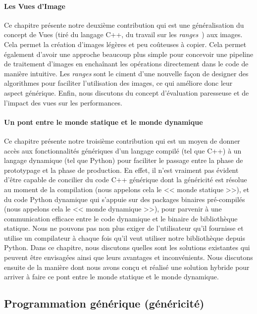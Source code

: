\paragraph{Les Vues d'Image} Ce chapitre présente notre deuxième contribution qui est une généralisation du concept de
Vues (tiré du langage C++, du travail sur les \emph{ranges}~\parencite{niebler.2018.ranges}) aux images. Cela permet la
création d'images légères et peu coûteuses à copier. Cela permet également d'avoir une approche beaucoup plus simple
pour concevoir une pipeline de traitement d'images en enchaînant les opérations directement dans le code de manière
intuitive. Les \emph{ranges} sont le ciment d'une nouvelle façon de designer des algorithmes pour faciliter
l'utilisation des images, ce qui améliore donc leur aspect générique. Enfin, nous discutons du concept d'évaluation
paresseuse et de l'impact des vues sur les performances.

\paragraph{Un pont entre le monde statique et le monde dynamique} Ce chapitre présente notre troisième contribution qui
est un moyen de donner accès aux fonctionnalités génériques d'un langage compilé (tel que C++) à un langage dynamique
(tel que Python) pour faciliter le passage entre la phase de prototypage et la phase de production. En effet, il n'est
vraiment pas évident d'être capable de concilier du code C++ générique dont la généricité est résolue au moment de la
compilation (nous appelons cela le << monde statique >>), et du code Python dynamique qui s'appuie sur des packages
binaires pré-compilés (nous appelons cela le << monde dynamique >>), pour parvenir à une communication efficace entre le
code dynamique et le binaire de bibliothèque statique. Nous ne pouvons pas non plus exiger de l'utilisateur qu'il
fournisse et utilise un compilateur à chaque fois qu'il veut utiliser notre bibliothèque depuis Python. Dans ce
chapitre, nous discutons quelles sont les solutions existantes qui peuvent être envisagées ainsi que leurs avantages et
inconvénients. Nous discutons ensuite de la manière dont nous avons conçu et réalisé une solution hybride pour arriver à
faire ce pont entre le monde statique et le monde dynamique.


\subsection*{Programmation générique (généricité)}


